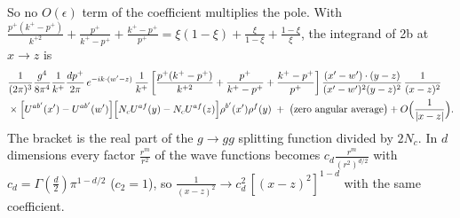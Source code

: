 \documentclass[10pt]{article}
\numberwithin{equation}{section}
\begin{document}
So no $O(\epsilon)$ term of the coefficient multiplies the pole. With $\frac{p^+(k^+-p^+)}{k^{+2}}+\frac{p^+}{k^+-p^+}+\frac{k^+-p^+}{p^+}=\xi(1-\xi)+\frac{\xi}{1-\xi}+\frac{1-\xi}{\xi}$, the integrand of 2b at $x\to z$ is
\begin{align}
&\frac{1}{(2\pi)^{3}}\frac{g^{4}}{8\pi^{4}}\frac{1}{k^{+}}\frac{dp^+}{2\pi}\,e^{-ik\cdot(w'-z)}\,\frac{1}{k^{+}}\left[\frac{p^{+}(k^{+}-p^{+})}{k^{+2}}+\frac{p^{+}}{k^{+}-p^{+}}+\frac{k^{+}-p^{+}}{p^{+}}\right]
\frac{(x'-w')\cdot(y-z)}{(x'-w')^{2}(y-z)^{2}}\,\frac{1}{(x-z)^{2}}\notag\\
&\times\Big[U^{ab'}(x')-U^{ab'}(w')\Big]\Big[N_cU^{af}(y)-N_cU^{af}(z)\Big]\rho^{b'}(x')\rho^{f}(y)
\;+\;\big(\text{zero angular average}\big)+O\Big(\frac{1}{|x-z|}\Big).
\label{eq:limit}
\end{align}
The bracket is the real part of the $g\to gg$ splitting function divided by $2N_c$. In $d$ dimensions every factor $\frac{r^m}{r^2}$ of the wave functions becomes $c_d\frac{r^m}{(r^2)^{d/2}}$ with $c_d=\Gamma(\frac d2)\pi^{1-d/2}$ ($c_2=1$), so $\frac{1}{(x-z)^2}\to c_d^2\,[(x-z)^2]^{1-d}$ with the same coefficient.

\end{document}
